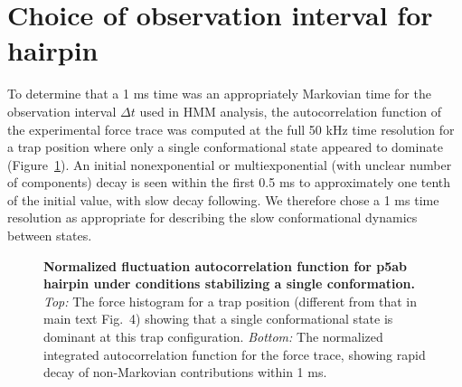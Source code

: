 \documentclass[endfloats,prl,twocolumn,superscriptaddress,nofootinbib,longbibliography]{revtex4-1}
\begin{document}

\section{Choice of observation interval for hairpin}
\label{section:choice-of-markov-time}

To determine that a 1 ms time was an appropriately Markovian time for the observation interval $\Delta t$ used in HMM analysis, the autocorrelation function of the experimental force trace was computed at the full 50 kHz time resolution for a trap position where only a single conformational state appeared to dominate (Figure~\ref{figure:p5ab-autocorrelation}).
An initial nonexponential or multiexponential (with unclear number of components) decay is seen within the first 0.5 ms to approximately one tenth of the initial value, with slow decay following.
We therefore chose a 1 ms time resolution as appropriate for describing the slow conformational dynamics between states.

\begin{figure}[p]
\noindent
{}
\caption{{\bf Normalized fluctuation autocorrelation function for p5ab hairpin under conditions stabilizing a single conformation.}
\emph{Top:} The force histogram for a trap position (different from that in main text Fig.~4) showing that a single conformational state is dominant at this trap configuration.
\emph{Bottom:} The normalized integrated autocorrelation function for the force trace, showing rapid decay of non-Markovian contributions within 1 ms.
\label{figure:p5ab-autocorrelation}}
\end{figure}

\widetext
\eject
\end{document}
